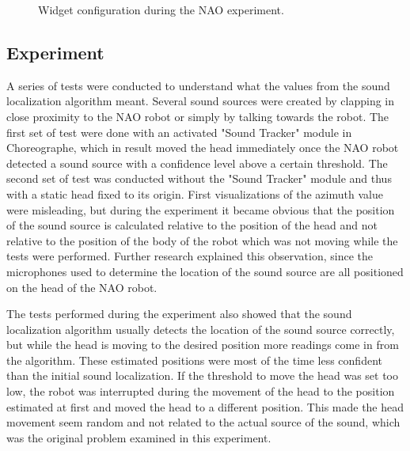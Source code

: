 \begin{figure}[htpb]
  \centering
  \caption{Widget configuration during the NAO experiment.}
  \label{nao_dashboard_screenshot}
\end{figure}

\subsection{Experiment}
A series of tests were conducted to understand what the values from the sound localization algorithm meant. Several sound sources were created by clapping in close proximity to the NAO robot or simply by talking towards the robot. The first set of test were done with an activated "Sound Tracker" module in Choreographe, which in result moved the head immediately once the NAO robot detected a sound source with a confidence level above a certain threshold. The second set of test was conducted without the "Sound Tracker" module and thus with a static head fixed to its origin. First visualizations of the azimuth value were misleading, but during the experiment it became obvious that the position of the sound source is calculated relative to the position of the head and not relative to the position of the body of the robot which was not moving while the tests were performed. Further research explained this observation, since the microphones used to determine the location of the sound source are all positioned on the head of the NAO robot.

The tests performed during the experiment also showed that the sound localization algorithm usually detects the location of the sound source correctly, but while the head is moving to the desired position more readings come in from the algorithm. These estimated positions were most of the time less confident than the initial sound localization. If the threshold to move the head was set too low, the robot was interrupted during the movement of the head to the position estimated at first and moved the head to a different position. This made the head movement seem random and not related to the actual source of the sound, which was the original problem examined in this experiment.

